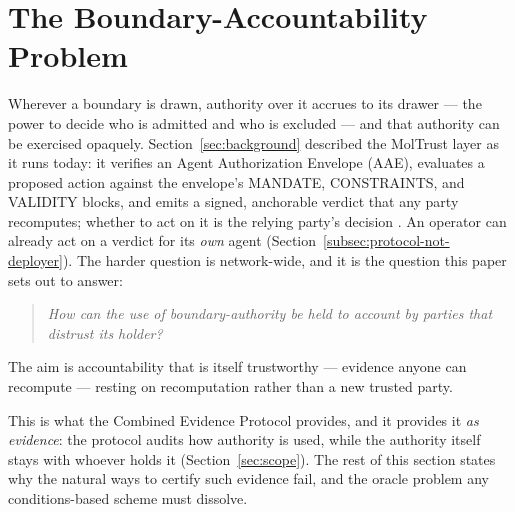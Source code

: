 
\section{The Boundary-Accountability Problem}
\label{sec:problem}

Wherever a boundary is drawn, authority over it accrues to its drawer — the power to decide who is admitted and who is excluded — and that authority can be exercised opaquely. Section~\ref{sec:background} described the MolTrust layer as it runs today: it verifies an Agent Authorization Envelope (AAE), evaluates a proposed action against the envelope's MANDATE, CONSTRAINTS, and VALIDITY blocks, and emits a signed, anchorable verdict that any party recomputes; whether to act on it is the relying party's decision \cite{ref28_techspec}. An operator can already act on a verdict for its \emph{own} agent (Section~\ref{subsec:protocol-not-deployer}). The harder question is network-wide, and it is the question this paper sets out to answer:

\begin{quote}
\emph{How can the use of boundary-authority be held to account by parties that distrust its holder?}
\end{quote}

\noindent The aim is accountability that is itself trustworthy — evidence anyone can recompute — resting on recomputation rather than a new trusted party.

This is what the Combined Evidence Protocol provides, and it provides it \emph{as evidence}: the protocol audits how authority is used, while the authority itself stays with whoever holds it (Section~\ref{sec:scope}). The rest of this section states why the natural ways to certify such evidence fail, and the oracle problem any conditions-based scheme must dissolve.

